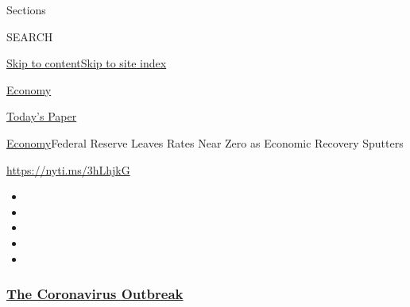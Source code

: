 Sections

SEARCH

\protect\hyperlink{site-content}{Skip to
content}\protect\hyperlink{site-index}{Skip to site index}

\href{https://www.nytimes3xbfgragh.onion/section/business/economy}{Economy}

\href{https://myaccount.nytimes3xbfgragh.onion/auth/login?response_type=cookie\&client_id=vi}{}

\href{https://www.nytimes3xbfgragh.onion/section/todayspaper}{Today's
Paper}

\href{/section/business/economy}{Economy}\textbar{}Federal Reserve
Leaves Rates Near Zero as Economic Recovery Sputters

\url{https://nyti.ms/3hLhjkG}

\begin{itemize}
\item
\item
\item
\item
\item
\end{itemize}

\hypertarget{the-coronavirus-outbreak}{%
\subsubsection{\texorpdfstring{\href{https://www.nytimes3xbfgragh.onion/news-event/coronavirus?name=styln-coronavirus-markets\&region=TOP_BANNER\&block=storyline_menu_recirc\&action=click\&pgtype=Article\&impression_id=44e98af0-f290-11ea-8ef7-cd06f6acdb7f\&variant=undefined}{The
Coronavirus
Outbreak}}{The Coronavirus Outbreak}}\label{the-coronavirus-outbreak}}

